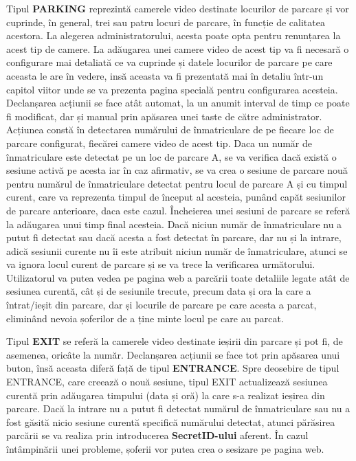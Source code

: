 \documentclass[12pt]{article}
\begin{document}
Tipul \textbf{PARKING} reprezint\u{a} camerele video destinate locurilor de parcare și vor cuprinde, \^{i}n general, trei sau patru locuri de parcare, \^{i}n funcție de calitatea acestora. La alegerea administratorului, acesta poate opta pentru renunțarea la acest tip de camere. La ad\u{a}ugarea unei camere video de acest tip va fi necesar\u{a} o configurare mai detaliat\u{a} ce va cuprinde și datele locurilor de parcare pe care aceasta le are \^{i}n vedere, ins\u{a} aceasta va fi prezentat\u{a} mai \^{i}n detaliu \^{i}ntr-un capitol viitor unde se va prezenta pagina special\u{a} pentru configurarea acesteia. Declanșarea acțiunii se face at\^{a}t automat, la un anumit interval de timp ce poate fi modificat, dar și manual prin ap\u{a}sarea unei taste de c\u{a}tre administrator. Acțiunea const\u{a} \^{i}n detectarea num\u{a}rului de \^{i}nmatriculare de pe fiecare loc de parcare configurat, fiec\u{a}rei camere video de acest tip. Daca un num\u{a}r de \^{i}nmatriculare este detectat pe un loc de parcare A, se va verifica dac\u{a} exist\u{a} o sesiune activ\u{a} pe acesta iar \^{i}n caz afirmativ, se va crea o sesiune de parcare nou\u{a} pentru num\u{a}rul de \^{i}nmatriculare detectat pentru locul de parcare A și cu timpul curent, care va reprezenta timpul de \^{i}nceput al acesteia, pun\^{a}nd cap\u{a}t sesiunilor de parcare anterioare, daca este cazul. \^{I}ncheierea unei sesiuni de parcare se refer\u{a} la ad\u{a}ugarea unui timp final acesteia. Dac\u{a} niciun num\u{a}r de \^{i}nmatriculare nu a putut fi detectat sau dac\u{a} acesta a fost detectat \^{i}n parcare, dar nu și la intrare, adic\u{a} sesiunii curente nu \^{i}i este atribuit niciun num\u{a}r de \^{i}nmatriculare, atunci se va ignora locul curent de parcare și se va trece la verificarea urm\u{a}torului. Utilizatorul va putea vedea pe pagina web a parc\u{a}rii toate detaliile legate at\^{a}t de sesiunea curent\u{a}, c\^{a}t și de sesiunile trecute, precum data și ora la care a \^{i}ntrat/ieșit din parcare, dar și locurile de parcare pe care acesta a parcat, elimin\^{a}nd nevoia șoferilor de a ține minte locul pe care au parcat.

Tipul \textbf{EXIT} se refer\u{a} la camerele video destinate ieșirii din parcare și pot fi, de asemenea, oric\^{a}te la num\u{a}r. Declanșarea acțiunii se face tot prin ap\u{a}sarea unui buton, \^{i}ns\u{a} aceasta difer\u{a} faț\u{a} de tipul \textbf{ENTRANCE}. Spre deosebire de tipul ENTRANCE, care creeaz\u{a} o nou\u{a} sesiune, tipul EXIT actualizeaz\u{a} sesiunea curent\u{a} prin ad\u{a}ugarea timpului (data și or\u{a}) la care s-a realizat ieșirea din parcare. Dac\u{a} la intrare nu a putut fi detectat num\u{a}rul de \^{i}nmatriculare sau nu a fost g\u{a}sit\u{a} nicio sesiune curent\u{a} specific\u{a} num\u{a}rului detectat, atunci p\u{a}r\u{a}sirea parc\u{a}rii se va realiza prin introducerea \textbf{SecretID-ului} aferent. \^{I}n cazul \^{i}nt\^{a}mpin\u{a}rii unei probleme, șoferii vor putea crea o sesizare pe pagina web.
\end{document}
